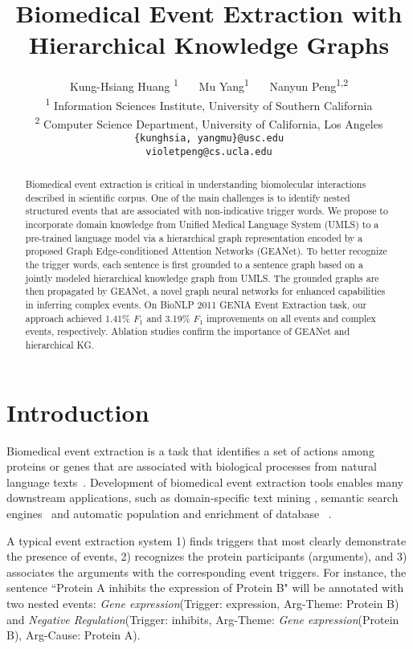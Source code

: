 \documentclass[11pt,a4paper]{article}
\title{Biomedical Event Extraction with Hierarchical Knowledge Graphs}
\author{
    Kung-Hsiang Huang \textsuperscript{\rm 1}~~~
    Mu Yang\textsuperscript{\rm 1}~~~
    Nanyun Peng\textsuperscript{\rm 1,2}\\
    \textsuperscript{\rm 1} Information Sciences Institute, University of Southern California\\
    \textsuperscript{\rm 2} Computer Science Department, University of California, Los Angeles \\
    {\tt \{kunghsia, yangmu\}@usc.edu}\\
    {\tt violetpeng@cs.ucla.edu} 
}
\date{}
\newcommand{\GAENet}{\textrm{GEANet}}
\newcommand{\GAENetFull}{Graph Edge-conditioned Attention Networks}
\begin{document}
\maketitle








\begin{abstract}

Biomedical event extraction is critical in understanding biomolecular interactions described in scientific corpus. One of the main challenges is to identify nested structured events that are associated with non-indicative trigger words. We propose to incorporate domain knowledge from Unified Medical Language System (UMLS) to a pre-trained language model via a hierarchical graph representation encoded by a proposed \GAENetFull{} (\GAENet). To better recognize the trigger words, each sentence is first grounded to a sentence graph based on a jointly modeled hierarchical knowledge graph from UMLS. The grounded graphs are then propagated by \GAENet, a novel graph neural networks for enhanced capabilities in inferring complex events. On BioNLP 2011 GENIA Event Extraction task, our approach achieved 1.41\% $F_{1}$ and 3.19\% $F_{1}$ improvements on all events and complex events, respectively. Ablation studies confirm the importance of \GAENet{} and hierarchical KG. 








\end{abstract} \section{Introduction}



Biomedical event extraction is a task that identifies a set of actions among proteins or genes that are associated with biological processes from natural language texts~\cite{kim-etal-2009-overview, kim2011overview}. Development of biomedical event extraction tools enables many downstream applications, such as domain-specific text mining \cite{ananiadou2015event,spangher2020enabling}, semantic search engines~\cite{miyao-etal-2006-semantic} and automatic population and enrichment of database ~\cite{hirschman2012text}. 

A typical event extraction system 1) finds triggers that most clearly demonstrate the presence of events, 2) recognizes the protein participants (arguments), and 3) associates the arguments with the corresponding event triggers. For instance, the sentence ``Protein A inhibits the expression of Protein B" will be annotated with two nested events: \textit{Gene expression}(Trigger: expression, Arg-Theme: 
Protein B) and \textit{Negative Regulation}(Trigger: inhibits, Arg-Theme: \textit{Gene expression}(Protein B), Arg-Cause: Protein A).
\end{document}
